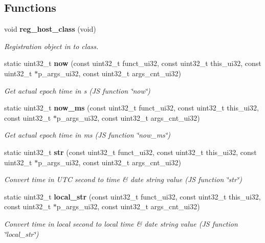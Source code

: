 \subsection*{Functions}
\begin{DoxyCompactItemize}
\item 
void \textbf{ reg\+\_\+host\+\_\+class} (void)
\begin{DoxyCompactList}\small\item\em Registration object in to class. \end{DoxyCompactList}\item 
static uint32\+\_\+t \textbf{ now} (const uint32\+\_\+t funct\+\_\+ui32, const uint32\+\_\+t this\+\_\+ui32, const uint32\+\_\+t $\ast$p\+\_\+args\+\_\+ui32, const uint32\+\_\+t args\+\_\+cnt\+\_\+ui32)
\begin{DoxyCompactList}\small\item\em Get actual epoch time in s (JS function \char`\"{}now\char`\"{}) \end{DoxyCompactList}\item 
static uint32\+\_\+t \textbf{ now\+\_\+ms} (const uint32\+\_\+t funct\+\_\+ui32, const uint32\+\_\+t this\+\_\+ui32, const uint32\+\_\+t $\ast$p\+\_\+args\+\_\+ui32, const uint32\+\_\+t args\+\_\+cnt\+\_\+ui32)
\begin{DoxyCompactList}\small\item\em Get actual epoch time in ms (JS function \char`\"{}now\+\_\+ms\char`\"{}) \end{DoxyCompactList}\item 
static uint32\+\_\+t \textbf{ str} (const uint32\+\_\+t funct\+\_\+ui32, const uint32\+\_\+t this\+\_\+ui32, const uint32\+\_\+t $\ast$p\+\_\+args\+\_\+ui32, const uint32\+\_\+t args\+\_\+cnt\+\_\+ui32)
\begin{DoxyCompactList}\small\item\em Convert time in U\+TC second to time \& date string value (JS function \char`\"{}str\char`\"{}) \end{DoxyCompactList}\item 
static uint32\+\_\+t \textbf{ local\+\_\+str} (const uint32\+\_\+t funct\+\_\+ui32, const uint32\+\_\+t this\+\_\+ui32, const uint32\+\_\+t $\ast$p\+\_\+args\+\_\+ui32, const uint32\+\_\+t args\+\_\+cnt\+\_\+ui32)
\begin{DoxyCompactList}\small\item\em Convert time in local second to local time \& date string value (JS function \char`\"{}local\+\_\+str\char`\"{}) \end{DoxyCompactList}\end{DoxyCompactItemize}


